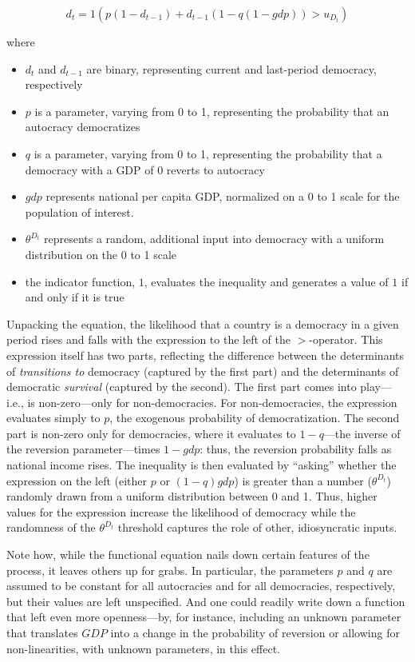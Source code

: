 \documentclass[
  12pt,
]{book}
\providecommand{\tightlist}{%
  \setlength{\itemsep}{0pt}\setlength{\parskip}{0pt}}
\begin{document}
\[d_t = 1 (p(1-d_{t-1}) + d_{t-1}(1-q(1-gdp)) > u_{D_t})\]

where

\begin{itemize}
\tightlist
\item
  \(d_t\) and \(d_{t-1}\) are binary, representing current and last-period democracy, respectively
\item
  \(p\) is a parameter, varying from 0 to 1, representing the probability that an autocracy democratizes
\item
  \(q\) is a parameter, varying from 0 to 1, representing the probability that a democracy with a GDP of 0 reverts to autocracy
\item
  \(gdp\) represents national per capita GDP, normalized on a 0 to 1 scale for the population of interest.
\item
  \(\theta^{D_t}\) represents a random, additional input into democracy with a uniform distribution on the 0 to 1 scale
\item
  the indicator function, \({1}\), evaluates the inequality and generates a value of \(1\) if and only if it is true
\end{itemize}

Unpacking the equation, the likelihood that a country is a democracy in a given period rises and falls with the expression to the left of the \(>\)-operator. This expression itself has two parts, reflecting the difference between the determinants of \emph{transitions to} democracy (captured by the first part) and the determinants of democratic \emph{survival} (captured by the second). The first part comes into play---i.e., is non-zero---only for non-democracies. For non-democracies, the expression evaluates simply to \(p\), the exogenous probability of democratization. The second part is non-zero only for democracies, where it evaluates to \(1-q\)---the inverse of the reversion parameter---times \(1-gdp\): thus, the reversion probability falls as national income rises. The inequality is then evaluated by ``asking'' whether the expression on the left (either \(p\) or \((1-q)gdp\)) is greater than a number (\(\theta^{D_t}\)) randomly drawn from a uniform distribution between 0 and 1. Thus, higher values for the expression increase the likelihood of democracy while the randomness of the \(\theta^{D_t}\) threshold captures the role of other, idiosyncratic inputs.

Note how, while the functional equation nails down certain features of the process, it leaves others up for grabs. In particular, the parameters \(p\) and \(q\) are assumed to be constant for all autocracies and for all democracies, respectively, but their values are left unspecified. And one could readily write down a function that left even more openness---by, for instance, including an unknown parameter that translates \(GDP\) into a change in the probability of reversion or allowing for non-linearities, with unknown parameters, in this effect.
\end{document}
